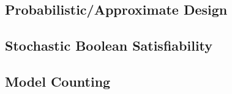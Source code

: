 \subsection{Probabilistic/Approximate Design}

\subsection{Stochastic Boolean Satisfiability}

\subsection{Model Counting}
